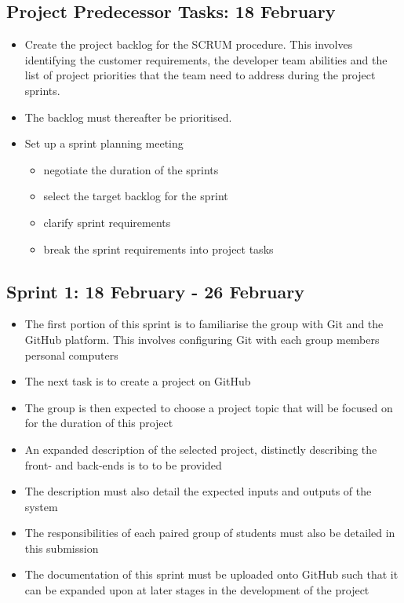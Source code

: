\documentclass[10pt, a4paper, onecolumn]{scrartcl}
\begin{document}
		\subsection{Project Predecessor Tasks: 18 February}
			
			\begin{itemize}
				\item Create the project backlog for the SCRUM procedure. This involves identifying the customer requirements, the developer team abilities and the list of project priorities that the team need to address during the project sprints. 
				\item The backlog must thereafter be prioritised. 
				\item Set up a sprint planning meeting
					\begin{itemize}
						\item negotiate the duration of the sprints 
						\item select the target backlog for the sprint
						\item clarify sprint requirements
						\item break the sprint requirements into project tasks
					\end{itemize}
			\end{itemize}
		
		\subsection{Sprint 1: 18 February - 26 February}
		
			\begin{itemize}[noitemsep]
				\item The first portion of this sprint is to familiarise the group with Git and the GitHub platform. This involves configuring Git with each group members personal computers 
				\item The next task is to create a project on GitHub
				\item The group is then expected to choose a project topic that will be focused on for the duration of this project
				\item An expanded description of the selected project, distinctly describing the front- and back-ends is to to be provided
				\item The description must also detail the expected inputs and outputs of the system
				\item The responsibilities of each paired group of students must also be detailed in this submission
				\item The documentation of this sprint must be uploaded onto GitHub such that it can be expanded upon at later stages in the development of the project
			\end{itemize}
			
\end{document}
